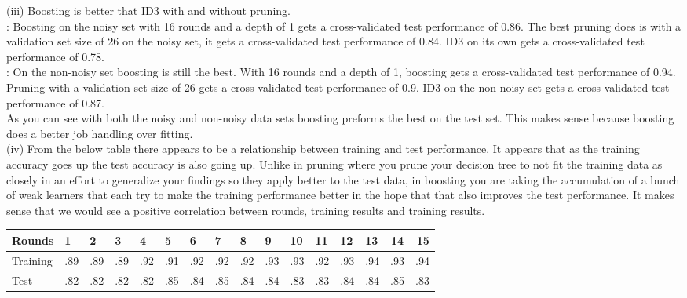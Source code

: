 \documentclass[solution, letterpaper]{cs121}
\begin{document}
(iii) Boosting is better that ID3 with and without pruning. \\
: 
Boosting on the noisy set with 16 rounds and a depth of 1 gets a cross-validated test performance of 0.86.
The best pruning does is with a validation set size of 26 on the noisy set, it gets a cross-validated test performance of 0.84. ID3 on its own gets a cross-validated test performance of 0.78.\\ 
:
On the non-noisy set boosting is still the best. With 16 rounds and a depth of 1, boosting gets a cross-validated test performance of 0.94. Pruning with a validation set size of 26 gets a cross-validated test performance of 0.9. ID3 on the non-noisy set gets a cross-validated test performance of 0.87. \\
\tab As you can see with both the noisy and non-noisy data sets boosting preforms the best on the test set. This makes sense because boosting does a better job handling over fitting. \\

(iv) From the below table there appears to be a relationship between training and test performance. It appears that as the training accuracy goes up the test accuracy is also going up. Unlike in pruning where you prune your decision tree to not fit the training data as closely in an effort to generalize your findings so they apply better to the test data, in boosting you are taking the accumulation of a bunch of weak learners that each try to make the training performance better in the hope that that also improves the test performance. It makes sense that we would see a positive correlation between rounds, training results and training results.\\

\begin{tabular}{ l | l l l l l l l l l l l l l c r }
  Rounds & 1 & 2 & 3 & 4 & 5 & 6 & 7 & 8 & 9 & 10 & 11 & 12 & 13 & 14 & 15 \\ \hline
  Training & .89 & .89 & .89 & .92 & .91 & .92 & .92 & .92 & .93 & .93 & .92 & .93 & .94 & .93 & .94 \\
   Test & .82 & .82 & .82 & .82 & .85 & .84 & .85 & .84 & .84 & .83 & .83 & .84 & .84 & .85 & .83 \\
  \end{tabular}
  
  
\end{document}

